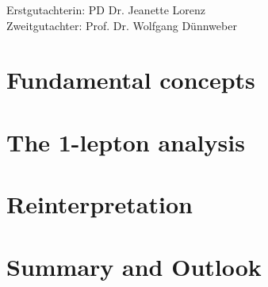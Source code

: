 \documentclass[a4paper,11pt,numbered,pdftex,dvipsnames,chapter]{Classes/PhDThesisPSnPDF}
\begin{document}
\frontmatter

\maketitle

\cleardoublepage

\makegermantitle
\newpage
Erstgutachterin: PD\@\xspace Dr.\@\xspace Jeanette Lorenz \\
Zweitgutachter: Prof.\@\xspace Dr.\@\xspace Wolfgang D\"unnweber






\tableofcontents

%




\mainmatter

\listoftodos[Notes]


\part{Fundamental concepts}\label{part:fundamentals}




\part{The 1-lepton analysis}\label{part:simplified_model_analysis}






\part{Reinterpretation}\label{part:reinterpretation}




\part{Summary and Outlook}\label{part:summary}

\end{document}

